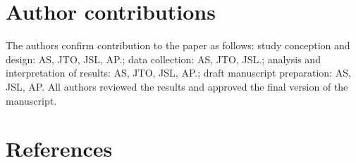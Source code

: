 \documentclass[10pt,letterpaper]{article}
\begin{document}
\hypertarget{author-contributions}{%
\section{Author contributions}\label{author-contributions}}

The authors confirm contribution to the paper as follows: study
conception and design: AS, JTO, JSL, AP.; data collection: AS, JTO,
JSL.; analysis and interpretation of results: AS, JTO, JSL, AP.; draft
manuscript preparation: AS, JSL, AP. All authors reviewed the results
and approved the final version of the manuscript.

\hypertarget{references}{%
\section*{References}\label{references}}
\end{document}
